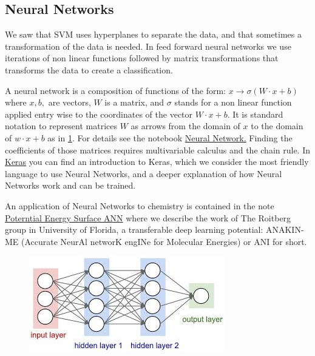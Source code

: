 \documentclass[11pt,letterpaper]{report}
\begin{document}
	\subsection{Neural Networks}  
	
	We saw that SVM uses  hyperplanes to separate the data, and that sometimes a transformation of the data is needed. In feed forward neural networks we use iterations of non linear functions followed by matrix transformations that transforms the data to create a classification.
	
	 A neural network is a composition of  functions of the form:
	$x\rightarrow \sigma(W\cdot x+b)$ where $x,b,$ are vectors, $W$ is a matrix, and $\sigma$ stands for a non linear function applied entry wise to the coordinates of the vector  $W\cdot x+b$.
	It is standard notation to represent matrices  $W$ as arrows from the domain of $x$ to the domain of $w\cdot x + b$ as in \ref{fig:nn}. For details see the notebook \href{ http://nbviewer.jupyter.org/mendozacortesgroup/machine_learning_class/blob/master/Lectures_Jupyter/L8_Neural_Networks/Artificial\%20Neural\%20Networks.ipynb}{Neural Network.}
	 Finding the coefficients of those matrices requires multivariable calculus and the chain rule. In \href{ http://nbviewer.jupyter.org/mendozacortesgroup/machine_learning_class/blob/master/Lectures_Jupyter/L8_Neural_Networks/Keras.ipynb}{Keras} you can find an introduction to Keras, which we consider the most friendly language to use Neural Networks, and a deeper explanation of how Neural Networks work and can be trained.	
	
	
	An application of Neural Networks to chemistry is contained in the note \href{ http://nbviewer.jupyter.org/mendozacortesgroup/machine_learning_class/blob/master/Lectures_Jupyter/L21_PotentialEnergySurface_ANN/L21_PotentialEnergySurface.ipynb}{Poterntial Energy Surface ANN} where we describe the work of The Roitberg group in University of Florida, a transferable deep learning potential: ANAKIN-ME (Accurate NeurAl networK engINe for Molecular Energies) or ANI for short.
	
    	\begin{figure}[h!]
    	\centering
    	\includegraphics[width=0.45\linewidth]{figures/nn.jpg}
    	\caption{}
    	\label{fig:nn}
    \end{figure} 	
    
\end{document}
